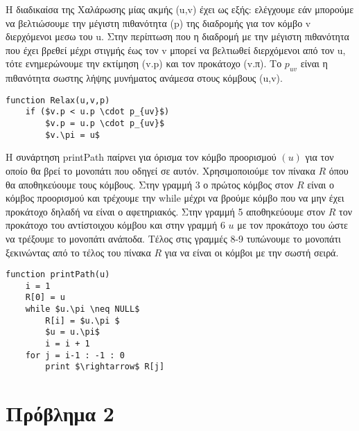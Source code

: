 \documentclass[a4paper]{article}
\begin{document}
Η διαδικαίσα της Χαλάρωσης μίας ακμής (u,v) έχει ως εξής: ελέγχουμε εάν μπορούμε να βελτιώσουμε την μέγιστη πιθανότητα (p) της διαδρομής για τον κόμβο v διερχόμενοι μεσω του u. Στην περίπτωση που η διαδρομή με την μέγιστη πιθανότητα που έχει βρεθεί μέχρι στιγμής έως τον v μπορεί να βελτιωθεί διερχόμενοι από τον u, τότε ενημερώνουμε την εκτίμηση (v.p) και τον προκάτοχο (v.π). Το $p_{uv}$ είναι η πιθανότητα σωστης λήψης μυνήματος ανάμεσα στους κόμβους (u,v).

\begin{lstlisting}[mathescape]
function Relax(u,v,p)
    if ($v.p < u.p \cdot p_{uv}$)
        $v.p = u.p \cdot p_{uv}$
        $v.\pi = u$
\end{lstlisting}

\newpage
Η συνάρτηση printPath παίρνει για όρισμα τον κόμβο προορισμού $(u)$ για τον οποίο θα βρεί το μονοπάτι που οδηγεί σε αυτόν. Χρησιμοποιούμε τον πίνακα $R$ όπου θα αποθηκεύουμε τους κόμβους. Στην γραμμή 3 ο πρώτος κόμβος στον $R$ είναι ο κόμβος προορισμού και τρέχουμε την while μέχρι να βρούμε κόμβο που να μην έχει προκάτοχο δηλαδή να είναι ο αφετηριακός. Στην γραμμή 5 αποθηκεύουμε στον $R$ τον προκάτοχο του αντίστοιχου κόμβου και στην γραμμή 6 $u$ με τον προκάτοχο του ώστε να τρέξουμε το μονοπάτι ανάποδα. Τέλος στις γραμμές 8-9 τυπώνουμε το μονοπάτι ξεκινώντας από το τέλος του πίνακα $R$ για να είναι οι κόμβοι με την σωστή σειρά.

\begin{lstlisting}[mathescape]
function printPath(u)
    i = 1
    R[0] = u
    while $u.\pi \neq NULL$
        R[i] = $u.\pi $
        $u = u.\pi$
        i = i + 1 
    for j = i-1 : -1 : 0
        print $\rightarrow$ R[j]
\end{lstlisting}

\newpage
\section*{Πρόβλημα 2}
\end{document}
